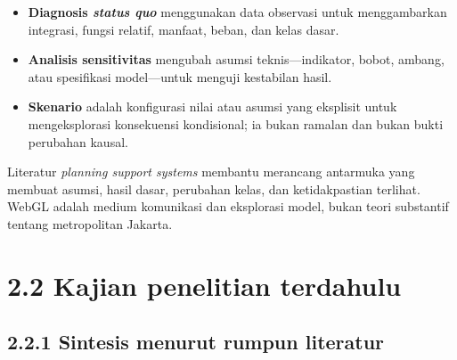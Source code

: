 \documentclass[
  indonesian,
  11pt,
  a4paper,
  oneside,
  openany]{report}
\providecommand{\tightlist}{%
  \setlength{\itemsep}{0pt}\setlength{\parskip}{0pt}}
\begin{document}
\begin{itemize}
\tightlist
\item
  \textbf{Diagnosis \emph{status quo}} menggunakan data observasi untuk
  menggambarkan integrasi, fungsi relatif, manfaat, beban, dan kelas
  dasar.
\item
  \textbf{Analisis sensitivitas} mengubah asumsi teknis---indikator,
  bobot, ambang, atau spesifikasi model---untuk menguji kestabilan
  hasil.
\item
  \textbf{Skenario} adalah konfigurasi nilai atau asumsi yang eksplisit
  untuk mengeksplorasi konsekuensi kondisional; ia bukan ramalan dan
  bukan bukti perubahan kausal.
\end{itemize}

Literatur \emph{planning support systems} membantu merancang antarmuka
yang membuat asumsi, hasil dasar, perubahan kelas, dan ketidakpastian
terlihat. WebGL adalah medium komunikasi dan eksplorasi model, bukan
teori substantif tentang metropolitan Jakarta.

\section{2.2 Kajian penelitian
terdahulu}\label{kajian-penelitian-terdahulu}

\subsection{2.2.1 Sintesis menurut rumpun
literatur}\label{sintesis-menurut-rumpun-literatur}
\end{document}
